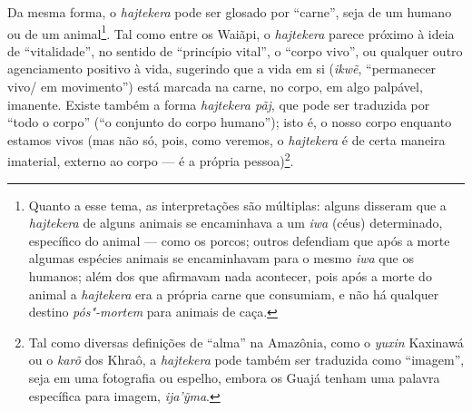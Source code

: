 Da mesma forma, o \emph{hajtekera} pode ser glosado por ``carne'', seja de
um humano ou de um animal\footnote{Quanto a esse tema, as interpretações
  são múltiplas: alguns disseram que a \emph{hajtekera} de alguns
  animais se encaminhava a um \emph{iwa} (céus) determinado, específico
  do animal --- como os porcos; outros defendiam que após a morte algumas
  espécies animais se encaminhavam para o mesmo \emph{iwa} que os
  humanos; além dos que afirmavam nada acontecer, pois após a morte do
  animal a \emph{hajtekera} era a própria carne que consumiam, e não há
  qualquer destino \emph{pós"-mortem} para animais de caça.}. Tal como
entre os Waiãpi, o \emph{hajtekera} parece próximo à ideia de
``vitalidade'', no sentido de ``princípio vital'', o ``corpo vivo'', ou
qualquer outro agenciamento positivo à vida, sugerindo que a vida em si
(\emph{ikwẽ}, ``permanecer vivo/ em movimento'') está marcada na carne, no
corpo, em algo palpável, imanente. Existe também a forma \emph{hajtekera
pãj}, que pode ser traduzida por ``todo o corpo'' (``o conjunto do corpo
humano''); isto é, o nosso corpo enquanto estamos vivos (mas não só,
pois, como veremos, o \emph{hajtekera} é de certa maneira imaterial,
externo ao corpo --- é a própria pessoa)\footnote{Tal como diversas
  definições de ``alma'' na Amazônia, como o \emph{yuxin} Kaxinawá ou o
  \emph{karõ} dos Khraô, a \emph{hajtekera} pode também ser traduzida
  como ``imagem'', seja em uma fotografia ou espelho, embora os Guajá
  tenham uma palavra específica para imagem, \emph{ija'ỹma}.}.

